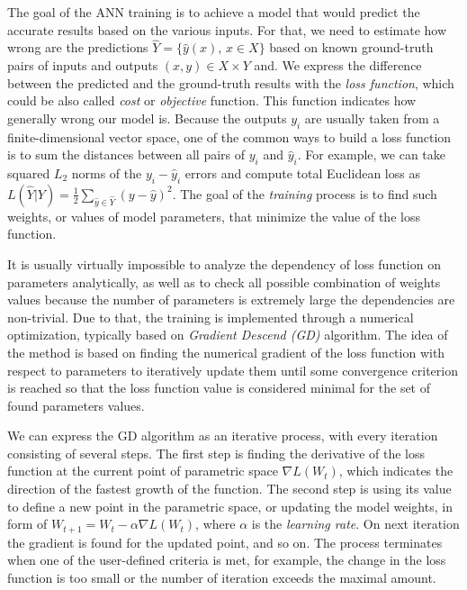The goal of the ANN training is to achieve a model that would predict the accurate results based on the various inputs.
For that, we need to estimate how wrong are the predictions $\hat{Y} = \{\hat{y}(x), \, x \in X \}$ based on known ground-truth pairs of inputs and outputs $ (x, y) \in X \times Y $ and.
We express the difference between the predicted and the ground-truth results with the \emph{loss function}, which could be also called \emph{cost} or \emph{objective} function.
This function indicates how generally wrong our model is.
Because the outputs $y_{i}$ are usually taken from a finite-dimensional vector space, one of the common ways to build a loss function is to sum the distances between all pairs of $y_{i}$ and $\hat{y}_{i}$.
For example, we can take squared $L_{2}$ norms of the $y_{i}-\hat{y}_{i}$ errors and compute total Euclidean loss as $ L(\hat{Y}|Y) = \frac{1}{2}\sum_{\hat{y} \in \hat{Y}}(y - \hat{y})^{2} $.
The goal of the \emph{training} process is to find such weights, or values of model parameters, that minimize the value of the loss function.
\medskip

It is usually virtually impossible to analyze the dependency of loss function on parameters analytically, as well as to check all possible combination of weights values because the number of parameters is extremely large the dependencies are non-trivial. 
Due to that, the training is implemented through a numerical optimization, typically based on \emph{Gradient Descend (GD)} algorithm. 
The idea of the method is based on finding the numerical gradient of the loss function with respect to parameters to iteratively update them until some convergence criterion is reached so that the loss function value is considered minimal for the set of found parameters values.
\medskip

We can express the GD algorithm as an iterative process, with every iteration consisting of several steps.
The first step is finding the derivative of the loss function at the current point of parametric space $\nabla L(W_{t})$, which indicates the direction of the fastest growth of the function. 
The second step is using its value to define a new point in the parametric space, or updating the model weights, in form of $W_{t+1}=W_{t}-\alpha \nabla L(W_{t})$, where $\alpha$ is the \emph{learning rate}.
On next iteration the gradient is found for the updated point, and so on. 
The process terminates when one of the user-defined criteria is met, for example, the change in the loss function is too small or the number of iteration exceeds the maximal amount.
\medskip

